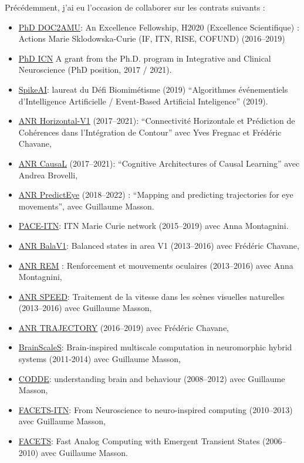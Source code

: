 \documentclass[10pt,french,a4paper,oneside]{article}%
\begin{document}
Précédemment, j'ai eu l'occasion de collaborer sur les contrats suivants :
\begin{itemize}
	\item  \href{https://laurentperrinet.github.io/grant/doc-2-amu/}{PhD DOC2AMU}: An Excellence Fellowship, H2020 (Excellence Scientifique) : Actions Marie Sklodowska-Curie (IF, ITN, RISE, COFUND) (2016--2019)
	\item \href{https://laurentperrinet.github.io/grant/phd-icn/}{PhD ICN} A grant from the Ph.D. program in Integrative and Clinical Neuroscience (PhD position, 2017 / 2021).
	\item  \href{https://laurentperrinet.github.io/grant/spikeai/}{SpikeAI}: laureat du Défi Biomimétisme (2019) ``Algorithmes événementiels d’Intelligence Artificielle / Event-Based Artificial Inteligence'' (2019).
	 \item \href{https://laurentperrinet.github.io/grant/anr-horizontal-v1/}{ANR Horizontal-V1} (2017--2021): ``Connectivité Horizontale et Prédiction de Cohérences dans l’Intégration de Contour'' avec Yves Fregnac et Frédéric Chavane,
	 \item \href{https://laurentperrinet.github.io/grant/anr-causal/}{ANR CausaL} (2017--2021): ``Cognitive Architectures of  Causal  Learning'' avec Andrea Brovelli,
	 \item \href{https://laurentperrinet.github.io/grant/anr-predicteye/}{ANR PredictEye} (2018--2022) : ``Mapping and predicting trajectories for eye movements'', avec Guillaume Masson.
	\item \href{https://laurentperrinet.github.io/grant/pace-itn/}{PACE-ITN}: ITN Marie Curie network (2015--2019) avec Anna Montagnini.
	\item \href{https://laurentperrinet.github.io/grant/anr-bala-v1/}{ANR BalaV1}: Balanced states in area V1 (2013--2016) avec Frédéric Chavane,
	\item \href{https://laurentperrinet.github.io/grant/anr-rem/}{ANR REM} : Renforcement et mouvements oculaires (2013--2016) avec Anna Montagnini,
	\item \href{https://laurentperrinet.github.io/grant/anr-speed/}{ANR SPEED}: Traitement de la vitesse dans les scènes visuelles naturelles (2013--2016)  avec Guillaume Masson,
	\item \href{https://laurentperrinet.github.io/grant/anr-trajectory/}{ANR TRAJECTORY} (2016--2019) avec Frédéric Chavane,
	\item  \href{https://laurentperrinet.github.io/grant/brain-scales/}{BrainScaleS}: Brain-inspired multiscale computation in neuromorphic hybrid systems (2011-2014) avec Guillaume Masson,
	\item \href{https://laurentperrinet.github.io/grant/codde/}{CODDE}: understanding brain and behaviour (2008--2012) avec Guillaume Masson,
	\item \href{https://laurentperrinet.github.io/grant/facets-itn/}{FACETS-ITN}: From Neuroscience to neuro-inspired computing (2010--2013) avec Guillaume Masson,
	\item \href{https://laurentperrinet.github.io/grant/facets/}{FACETS}: Fast Analog Computing with Emergent Transient States (2006--2010) avec Guillaume Masson.
\end{itemize}
\end{document}

